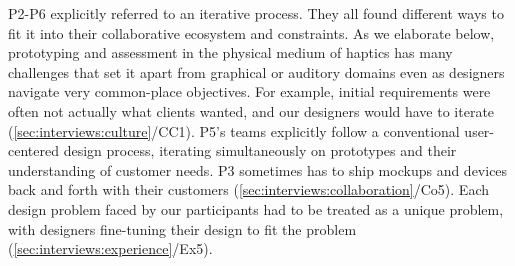 



P2-P6 explicitly referred to an iterative process. They all found different ways to fit it into their collaborative ecosystem and constraints.
As we elaborate below, prototyping and assessment in the physical medium of haptics has many challenges that set it apart from graphical or auditory domains even as designers navigate very common-place objectives. For example,
initial requirements were often not actually what clients wanted, and our designers would have to iterate (\ref{sec:interviews:culture}/CC1).
P5's teams explicitly follow a conventional user-centered design process, iterating simultaneously on prototypes and their understanding of customer needs.
P3 sometimes has to ship mockups and devices back and forth with their customers (\ref{sec:interviews:collaboration}/Co5).
Each design problem faced by our participants had to be treated as a unique problem, with designers fine-tuning their design to fit the problem (\ref{sec:interviews:experience}/Ex5).
